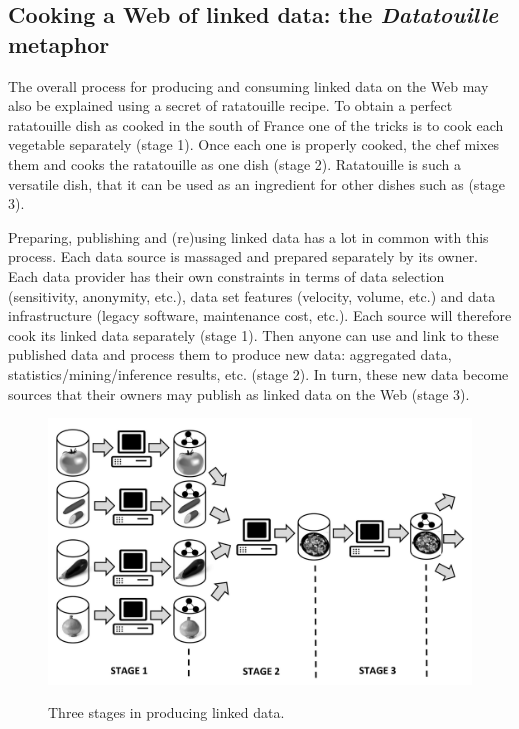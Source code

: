 \hypertarget{cooking-a-web-of-linked-data-the-datatouille-metaphor}{%
\subsection{\texorpdfstring{Cooking a Web of linked data: the
\emph{Datatouille}
metaphor}{Cooking a Web of linked data: the Datatouille metaphor.  }}\label{cooking-a-web-of-linked-data-the-datatouille-metaphor}}

The overall process for producing and consuming linked data on the Web
may also be explained using a secret of ratatouille recipe. To obtain a
perfect ratatouille dish as cooked in the south of France one of the
tricks is to cook each vegetable separately (stage 1). Once each one is
properly cooked, the chef mixes them and cooks the ratatouille as one
dish (stage 2). Ratatouille is such a versatile dish, that it can be
used as an ingredient for other dishes such as (stage 3).

Preparing, publishing and (re)using linked data has a lot in common with
this process. Each data source is massaged and prepared separately by
its owner. Each data provider has their own
constraints in terms of data selection (sensitivity, anonymity, etc.),
data set features (velocity, volume, etc.) and data infrastructure
(legacy software, maintenance cost, etc.). Each source will therefore
cook its linked data separately (stage 1). Then anyone can use and link
to these published data and process them to produce new data: aggregated
data, statistics/mining/inference results, etc. (stage 2). In turn,
these new data become sources that their owners may publish as linked
data on the Web (stage 3).

\begin{figure}

\includegraphics[width=5in]{media/ch5/figure-05-13x}
\label{fig:ch5.13x}
\caption{Three stages in producing linked data.}
\end{figure}

